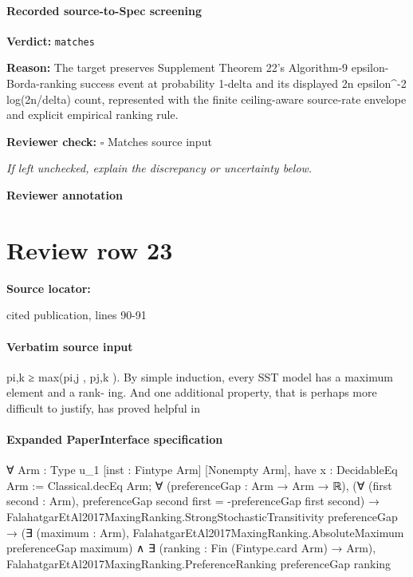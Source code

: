 \documentclass[10pt]{article}
\newcommand{\reviewerbox}{%
  \par\noindent\fbox{\parbox{0.96\linewidth}{\rule{0pt}{0.38in}}}\par
}
\newcommand{\reviewmatch}[1]{%
  \par\noindent\textbf{Reviewer check:} $\square$\; #1\par
  \noindent\emph{If left unchecked, explain the discrepancy or uncertainty below.}\par
}
\begin{document}
\paragraph{Recorded source-to-Spec screening}
\textbf{Verdict:} \texttt{matches}
\\
{\raggedright
\textbf{Reason:} The target preserves Supplement Theorem 22's Algorithm-\allowbreak{}9 epsilon-\allowbreak{}Borda-\allowbreak{}ranking success event at probability 1-\allowbreak{}delta and its displayed 2n epsilon\textasciicircum{}-\allowbreak{}2 log(2n/\allowbreak{}delta) count, represented with the finite ceiling-\allowbreak{}aware source-\allowbreak{}rate envelope and explicit empirical ranking rule.\allowbreak{}
\par}
\reviewmatch{Matches source input}
\noindent\textbf{Reviewer annotation}\par
\reviewerbox
\clearpage
\hypertarget{source-claim-948aca3b2ce42007}{}
\section*{Review row 23}
\textbf{Source locator:} {\footnotesize\raggedright cited publication, lines 90-\allowbreak{}91\par}
\paragraph{Verbatim source input}
\begin{ReviewVerbatim}
pi,k ≥ max(pi,j , pj,k ). By simple induction, every SST model has a maximum element and a rank-
ing. And one additional property, that is perhaps more difficult to justify, has proved helpful in
\end{ReviewVerbatim}



\paragraph{Expanded PaperInterface specification}
\begin{ReviewVerbatim}
∀ {Arm : Type u_1} [inst : Fintype Arm] [Nonempty Arm],
  have x : DecidableEq Arm := Classical.decEq Arm;
  ∀ (preferenceGap : Arm → Arm → ℝ),
    (∀ (first second : Arm), preferenceGap second first = -preferenceGap first second) →
      FalahatgarEtAl2017MaxingRanking.StrongStochasticTransitivity preferenceGap →
        (∃ (maximum : Arm), FalahatgarEtAl2017MaxingRanking.AbsoluteMaximum preferenceGap maximum) ∧
          ∃ (ranking : Fin (Fintype.card Arm) → Arm),
            FalahatgarEtAl2017MaxingRanking.PreferenceRanking preferenceGap ranking
\end{ReviewVerbatim}
\end{document}
